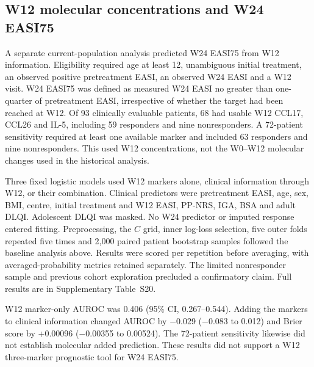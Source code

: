 \documentclass[10pt,a4paper]{article}
\begin{document}
\subsection{W12 molecular concentrations and W24 EASI75}
A separate current-population analysis predicted W24 EASI75 from W12 information. Eligibility required age at least 12, unambiguous initial treatment, an observed positive pretreatment EASI, an observed W24 EASI and a W12 visit. W24 EASI75 was defined as measured W24 EASI no greater than one-quarter of pretreatment EASI, irrespective of whether the target had been reached at W12. Of 93 clinically evaluable patients, 68 had usable W12 CCL17, CCL26 and IL-5, including 59 responders and nine nonresponders. A 72-patient sensitivity required at least one available marker and included 63 responders and nine nonresponders. This used W12 concentrations, not the W0--W12 molecular changes used in the historical analysis.

Three fixed logistic models used W12 markers alone, clinical information through W12, or their combination. Clinical predictors were pretreatment EASI, age, sex, BMI, centre, initial treatment and W12 EASI, PP-NRS, IGA, BSA and adult DLQI. Adolescent DLQI was masked. No W24 predictor or imputed response entered fitting. Preprocessing, the $C$ grid, inner log-loss selection, five outer folds repeated five times and 2,000 paired patient bootstrap samples followed the baseline analysis above. Results were scored per repetition before averaging, with averaged-probability metrics retained separately. The limited nonresponder sample and previous cohort exploration precluded a confirmatory claim. Full results are in Supplementary Table~S20.

W12 marker-only AUROC was 0.406 (95\% CI, 0.267--0.544). Adding the markers to clinical information changed AUROC by $-$0.029 ($-$0.083 to 0.012) and Brier score by +0.00096 ($-$0.00355 to 0.00524). The 72-patient sensitivity likewise did not establish molecular added prediction. These results did not support a W12 three-marker prognostic tool for W24 EASI75.
\end{document}
